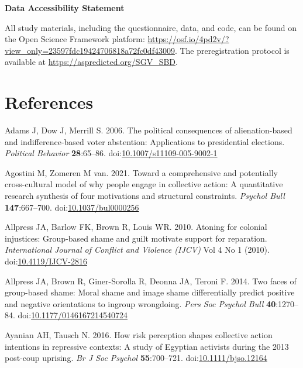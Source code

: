 \documentclass[
]{article}
\newlength{\cslhangindent}
\newenvironment{CSLReferences}[2] %
 {\begin{list}{}{%
  \setlength{\itemindent}{0pt}
  \setlength{\leftmargin}{0pt}
  \setlength{\parsep}{0pt}
  \ifodd #1
   \setlength{\leftmargin}{\cslhangindent}
   \setlength{\itemindent}{-1\cslhangindent}
  \fi
  \setlength{\itemsep}{#2\baselineskip}}}
 {\end{list}}
\begin{document}
\textbf{Data Accessibility Statement}

All study materials, including the questionnaire, data, and code, can be found on the Open Science Framework platform: \url{https://osf.io/4pd2v/?view_only=23597fdc19424706818a72fc0df43009}. The preregistration protocol is available at \url{https://aspredicted.org/SGV_SBD}.

\vspace{10mm}

\section*{References}\label{references}

\label{refs}
\begin{CSLReferences}{1}{0}
Adams J, Dow J, Merrill S. 2006. The political consequences of alienation-based and indifference-based voter abstention: Applications to presidential elections. \emph{Political Behavior} \textbf{28}:65--86. doi:\href{https://doi.org/10.1007/s11109-005-9002-1}{10.1007/s11109-005-9002-1}

Agostini M, Zomeren M van. 2021. Toward a comprehensive and potentially cross-cultural model of why people engage in collective action: A quantitative research synthesis of four motivations and structural constraints. \emph{Psychol Bull} \textbf{147}:667--700. doi:\href{https://doi.org/10.1037/bul0000256}{10.1037/bul0000256}

Allpress JA, Barlow FK, Brown R, Louis WR. 2010. Atoning for colonial injustices: Group-based shame and guilt motivate support for reparation. \emph{International Journal of Conflict and Violence (IJCV)} Vol 4 No 1 (2010). doi:\href{https://doi.org/10.4119/IJCV-2816}{10.4119/IJCV-2816}

Allpress JA, Brown R, Giner-Sorolla R, Deonna JA, Teroni F. 2014. Two faces of group-based shame: Moral shame and image shame differentially predict positive and negative orientations to ingroup wrongdoing. \emph{Pers Soc Psychol Bull} \textbf{40}:1270--84. doi:\href{https://doi.org/10.1177/0146167214540724}{10.1177/0146167214540724}

Ayanian AH, Tausch N. 2016. How risk perception shapes collective action intentions in repressive contexts: A study of {Egyptian} activists during the 2013 post-coup uprising. \emph{Br J Soc Psychol} \textbf{55}:700--721. doi:\href{https://doi.org/10.1111/bjso.12164}{10.1111/bjso.12164}


\end{CSLReferences}
\end{document}
